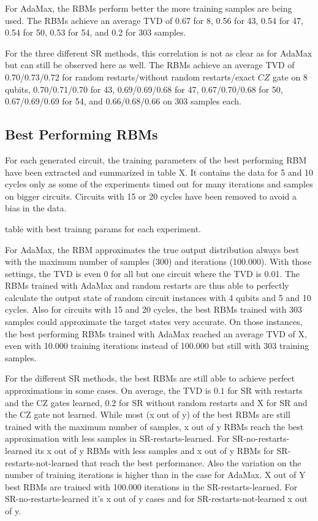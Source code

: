 For AdaMax, the RBMs perform better the more training samples are being used. The RBMs achieve an average 
TVD of 0.67 for 8, 0.56 for 43, 0.54 for 47, 0.54 for 50, 0.53 for 54, and 0.2 for 303 samples. 

For the three different SR methods, this correlation is not as clear as for AdaMax but can still be observed here 
as well. The RBMs achieve an average 
TVD of 0.70/0.73/0.72 for random restarts/without random restarts/exact $CZ$ gate on 8 qubits,
0.70/0.71/0.70 for 43, 0.69/0.69/0.68 for 47, 0.67/0.70/0.68 for 50, 0.67/0.69/0.69 for 54, and 
0.66/0.68/0.66 on 303 samples each.


\subsection{Best Performing RBMs}
For each generated circuit, the training parameters of the best performing RBM have been extracted and 
summarized in table X. It contains the data for 5 and 10 cycles only as some of the experiments timed out 
for many iterations and samples on bigger circuits. Circuits with 15 or 20 cycles have been removed to 
avoid a bias in the data.

table with best trainng params for each experiment.

For AdaMax, the RBM approximates the true output distribution always best with the maximum number of samples (300)
and iterations (100.000). With those settings, the TVD is even 0 for all but one circuit where the TVD is 0.01. The 
RBMs trained with AdaMax and random restarts are thus able to perfectly calculate the output state of random circuit
instances with 4 qubits and 5 and 10 cycles. Also for circuits with 15 and 20 cycles, the best RBMs trained with 
303 samples could approximate the target states very accurate. On those instances, the best performing RBMs trained with 
AdaMax reached an average TVD of X, even with 10.000 training iterations instead of 100.000 but still with 303 training samples.

For the different SR methods, the best RBMs are still able to achieve perfect approximations in some cases. On average, the 
TVD is $0.1$ for SR with restarts and the CZ gates learned, $0.2$ for SR without random restarts and X for SR and the CZ gate not learned.
While most (x out of y) of the best RBMs are still trained with the maximum number of samples, x out of y RBMs reach the best 
approximation with less samples in SR-restarts-learned. For SR-no-restarts-learned its x out of y RBMs with less samples and x out of y 
RBMs for SR-restarts-not-learned that reach the best performance. Also the variation on the number of training iterations is higher
than in the case for AdaMax. 
X out of Y best RBMs are trained with 100.000 iterations in the SR-restarts-learned. For SR-no-restarts-learned it's x out of y 
cases and for SR-restarts-not-learned x out of y. 

